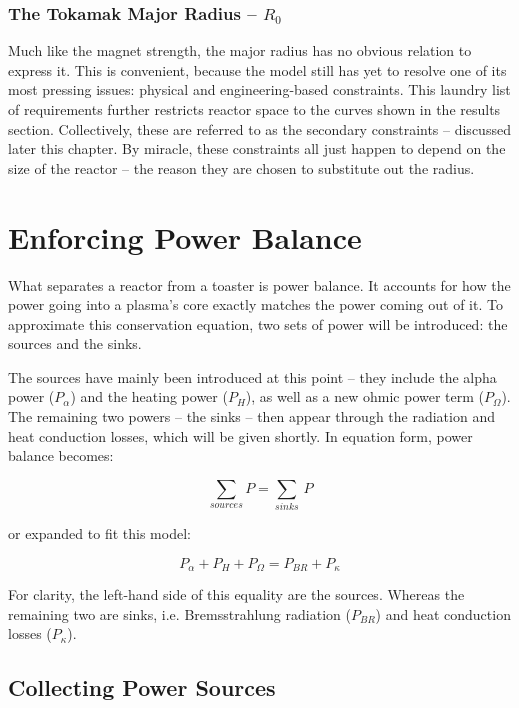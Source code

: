 \subsubsection{The Tokamak Major Radius -- $R_0$}

Much like the magnet strength, the major radius has no obvious relation to express it. This is convenient, because the model still has yet to resolve one of its most pressing issues: physical and engineering-based constraints. This laundry list of requirements further restricts reactor space to the curves shown in the results section. Collectively, these are referred to as the secondary constraints -- discussed later this chapter. By miracle, these constraints all just happen to depend on the size of the reactor -- the reason they are chosen to substitute out the radius. 

\section{Enforcing Power Balance}

What separates a reactor from a toaster is power balance. It accounts for how the power going into a plasma's core exactly matches the power coming out of it. To approximate this conservation equation, two sets of power will be introduced: the sources and the sinks. 

The sources have mainly been introduced at this point -- they include the alpha power ($P_\alpha$) and the heating power ($P_H$), as well as a new ohmic power term ($P_\Omega$). The remaining two powers -- the sinks -- then appear through the radiation and heat conduction losses, which will be given shortly. In equation form, power balance becomes:

\begin{equation}
	\sum_{sources} P = \sum_{sinks} \, P
\end{equation}

or expanded to fit this model:

\begin{equation}
	\label{eq:power_balance}
	P_\alpha + P_H + P_\Omega = P_{BR} + P_\kappa
\end{equation}

For clarity, the left-hand side of this equality are the sources. Whereas the remaining two are sinks, i.e. Bremsstrahlung radiation ($P_{BR}$) and heat conduction losses ($P_\kappa$).

\subsection{Collecting Power Sources}

